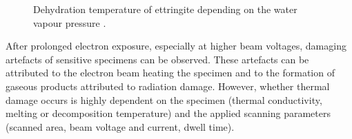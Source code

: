\begin{figure}[!htb]
    \caption{
        Dehydration temperature of ettringite depending on the water vapour pressure \cite{zhou.2001}.
    }
    \label{fig:ettringite_dehydration}
\end{figure}


After prolonged electron exposure, especially at higher beam voltages, damaging artefacts of sensitive specimens can be observed.
These artefacts can be attributed to the electron beam heating the specimen and to the formation of gaseous products attributed to radiation damage.
However, whether thermal damage occurs is highly dependent on the specimen (thermal conductivity, melting or decomposition temperature) and the applied scanning parameters (scanned area, beam voltage and current, dwell time). \cite{reimer.1998b}

